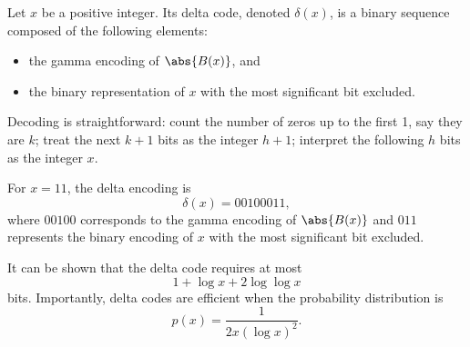 \documentclass{subfiles}
\begin{document}
    Let \(x\) be a positive integer. Its delta code, denoted \(\delta(x)\), 
        is a binary sequence composed of the following elements:
        \begin{itemize}
            \item the gamma encoding of \(\abs{B(x)}\), and
            \item the binary representation of \(x\) with the most significant 
                  bit excluded.
        \end{itemize}

    Decoding is straightforward: count the number of zeros up to the first 1, 
        say they are \(k\); treat the next \(k + 1\) bits as the integer \(h + 1\);
        interpret the following \(h\) bits as the integer \(x\).

    \begin{example*}
        For \(x = 11\), the delta encoding is
        \[
            \delta(x) = 00100 011,
        \]
        where \(00100\) corresponds to the gamma encoding of \(\abs{B(x)}\) 
        and \(011\) represents the binary encoding of \(x\) with the most 
        significant bit excluded.
    \end{example*}

    It can be shown that 
        the delta code requires at most 
        \[
            1 + \log x + 2 \log \log x
        \] 
        bits. Importantly, delta codes are efficient when the probability 
        distribution is 
        \[
            p(x) = \frac{1}{2 x (\log x)^{2}}.
        \]
\end{document}
